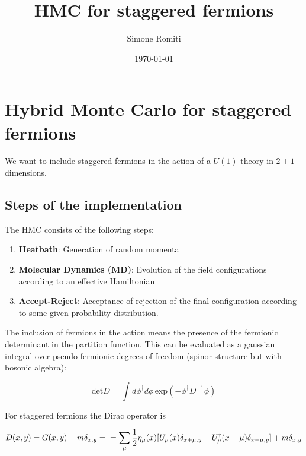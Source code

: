 \documentclass[12pt, a4paper]{article}
\title{HMC for staggered fermions}
\author{Simone Romiti}
\date{\today}
\begin{document}





\maketitle

\section{Hybrid Monte Carlo for staggered fermions}

We want to include staggered fermions \cite{BITAR1989377} in the action of a $U(1)$ theory in $2+1$ dimensions.

\subsection{Steps of the implementation}

The HMC consists of the following steps:

\begin{enumerate}
    \item 
    \textbf{Heatbath}: 
    Generation of random momenta
    \item 
    \textbf{Molecular Dynamics (MD)}: 
    Evolution of the field configurations according to an effective Hamiltonian
    \item
    \textbf{Accept-Reject}: 
    Acceptance of rejection of the final configuration 
    according to some given probability distribution.
\end{enumerate}
%
The inclusion of fermions in the action means the presence of the fermionic determinant in the partition function. 
This can be evaluated as a gaussian integral over pseudo-fermionic degrees of freedom 
(spinor structure but with bosonic algebra):

\begin{equation}
\text{det} D = 
\int d \phi^{\dagger} d \phi 
\, \text{exp}(-\phi^{\dagger} D^{-1} \phi)
\end{equation}

For staggered fermions the Dirac operator is

\begin{equation}
D(x,y) = G(x,y) + m \delta_{x,y} = \\ 
=  \sum_{\mu} \frac{1}{2} \eta_{\mu}(x) 
    [U_{\mu}(x) \delta_{x+\mu, y} -
     U^{\dagger}_{\mu}(x-\mu) \delta_{x-\mu, y} ]
+ m \delta_{x, y}
\end{equation}
\end{document}
